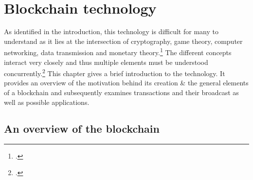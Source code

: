 \chapter{Blockchain technology}

As identified in the introduction, this technology is difficult for many to understand as it lies at the intersection of cryptography, game theory, computer networking, data transmission and monetary theory.\footcite[Cf.][]{LoppNobodyUnderstandsBitcoin2017} The different concepts interact very closely and thus multiple elements must be understood concurrently.\footcite[Cf.][p.2]{SwellerVisualisationInstructionalDesign2002} This chapter gives a  brief introduction to the technology. It provides an overview of the motivation behind its creation \& the general elements of a blockchain and subsequently examines transactions and their broadcast as well as possible applications. 

\section{An overview of the blockchain} \label{sec:Blockchain}


